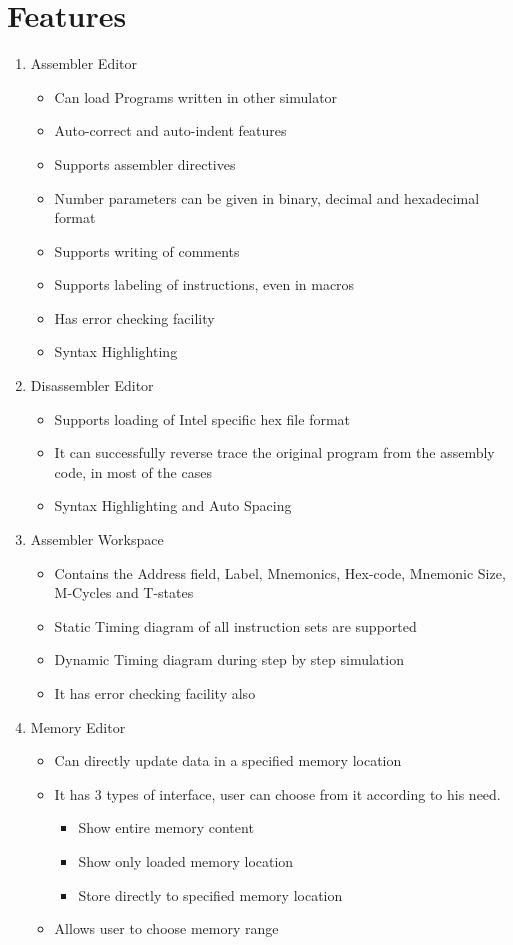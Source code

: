 \chapter{Features}
\begin{enumerate}
\item Assembler Editor
	\begin{itemize}
	\item Can load Programs written in other simulator
	\item Auto-correct and auto-indent  features 
	\item Supports assembler directives
	\item Number parameters can be given in binary, decimal and hexadecimal format
	\item Supports writing of comments
	\item Supports labeling of instructions, even in macros
	\item Has error checking facility
	\item Syntax Highlighting
	\end{itemize}
\item Disassembler Editor
	\begin{itemize}
	\item Supports loading of Intel specific hex file format
	\item It can successfully reverse trace the original program from the assembly code, in most of the cases
	\item Syntax Highlighting and Auto Spacing
	\end{itemize}	
\item Assembler Workspace
	\begin{itemize}
	\item Contains the Address field, Label, Mnemonics, Hex-code, Mnemonic Size, M-Cycles and T-states
	\item Static Timing diagram of all instruction sets are supported 
	\item Dynamic Timing diagram during step by step simulation
	\item It has error checking facility also
	\end{itemize}
	
\item  Memory Editor
	\begin{itemize}
	\item Can directly update data in a specified memory location
	\item It has 3 types of interface, user can choose from it according to his need.
		\begin{itemize}
		\item Show entire memory content
		\item Show only loaded memory location
		\item Store directly to specified memory location
		\end{itemize}
	\item Allows user to choose memory range
	\end{itemize}


\end{enumerate}
